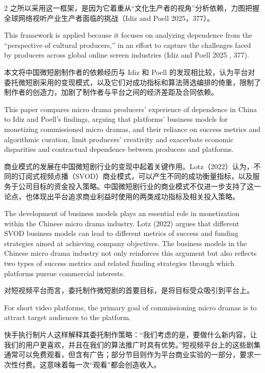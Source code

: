 \documentclass[10pt,a4paper]{article}
\begin{document}
\begin{paracol}{2}
之所以采用这一框架，是因为它着重从“文化生产者的视角”分析依赖，力图把握全球网络视听产业生产者面临的挑战（Idiz and Poell 2025，377）。\par
\switchcolumn
This framework is applied because it focuses on analyzing dependence from the “perspective of cultural producers,” in an effort to capture the challenges faced by producers across global online screen industries (Idiz and Poell 2025 , 377).\par
\switchcolumn*
本文将中国微短剧制作者的依赖经历与 Idiz 和 Poell 的发现相比较，认为平台对委托微短剧采用的变现模式，以及它们对成功指标和算法筛选编排的倚重，限制了制作者的创造力，加剧了制作者与平台之间的经济差距及合同依赖。\par
\switchcolumn
This paper compares micro drama producers’ experience of dependence in China to Idiz and Poell’s findings, arguing that platforms’ business models for monetizing commissioned micro dramas, and their reliance on success metrics and algorithmic curation, limit producers’ creativity and exacerbate economic disparities and contractual dependence between producers and platforms.\par
\switchcolumn*
商业模式的发展在中国微短剧行业的变现中起着关键作用。Lotz（2022）认为，不同的订阅式视频点播（SVOD）商业模式，可以产生不同的成功衡量指标，以及服务于公司目标的资金投入策略。中国微短剧行业的商业模式不仅进一步支持了这一论点，也体现出平台追求商业利益时使用的两类成功指标及相关投入策略。\par
\switchcolumn
The development of business models plays an essential role in monetization within the Chinese micro drama industry. Lotz (2022) argues that different SVOD business models can lead to different metrics of success and funding strategies aimed at achieving company objectives. The business models in the Chinese micro drama industry not only reinforces this argument but also reflects two types of success metrics and related funding strategies through which platforms pursue commercial interests.\par
\switchcolumn*
对短视频平台而言，委托制作微短剧的首要目标，是将目标受众吸引到平台上。\par
\switchcolumn
For short video platforms, the primary goal of commissioning micro dramas is to attract target audiences to the platform.\par
\switchcolumn*
快手执行制片人这样解释其委托制作策略：“我们考虑的是，要做什么新内容，让我们的用户更喜欢，并且在我们的算法推广时具有优势。”短视频平台上的这些剧集通常可以免费观看，但含有广告；部分节目则作为平台商业实验的一部分，要求一次性付费。这意味着每一次“观看”都会创造收入。\par

\end{paracol}
\end{document}
